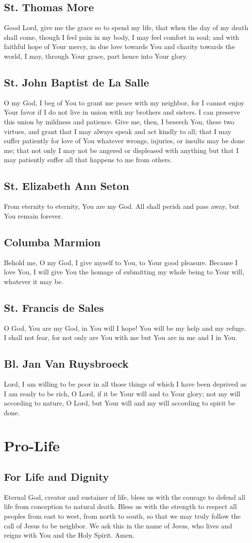 \documentclass[12pt]{article}
\newcommand{\prayersection}[1]{\section{#1}}
\newcommand{\prayertitle}[1]{\subsection{#1}}
\begin{document}
\prayertitle{St. Thomas More}
Good Lord, give me the grace so to spend my life, that when the day of my death shall come, though I feel pain in my body, I may feel comfort in soul;
and with faithful hope of Your mercy, in due love towards You and charity towards the world, I may, through Your grace, part hence into Your glory.

\prayertitle{St. John Baptist de La Salle}
O my God, I beg of You to grant me peace with my neighbor, for I cannot enjoy Your favor if I do not live in union with my brothers and sisters.
I can preserve this union by mildness and patience.
Give me, then, I beseech You, these two virtues, and grant that I may always speak and act kindly to all;
that I may suffer patiently for love of You whatever wrongs, injuries, or insults may be done me;
that not only I may not be angered or displeased with anything but that I may patiently suffer all that happens to me from others.

\prayertitle{St. Elizabeth Ann Seton}
From eternity to eternity, You are my God.
All shall perish and pass away, but You remain forever.

\prayertitle{Columba Marmion}
Behold me, O my God, I give myself to You, to Your good pleasure.
Because I love You, I will give You the homage of submitting my whole being to Your will, whatever it may be.

\prayertitle{St. Francis de Sales}
O God, You are my God, in You will I hope!
You will be my help and my refuge.
I shall not fear, for not only are You with me but You are in me and I in You.

\prayertitle{Bl. Jan Van Ruysbroeck}
Lord, I am willing to be poor in all those things of which I have been deprived as I am ready to be rich, O Lord, if it be Your will and to Your glory;
not my will according to nature, O Lord, but Your will and my will according to spirit be done.

\newpage

\prayersection{Pro-Life}
\prayertitle{For Life and Dignity}
Eternal God, creator and sustainer of life, bless us with the courage to defend all life from conception to natural death.
Bless us with the strength to respect all peoples from east to west, from north to south,
so that we may truly follow the call of Jesus to be neighbor.
We ask this in the name of Jesus, who lives and reigns with You and the Holy Spirit.
Amen.
\end{document}
